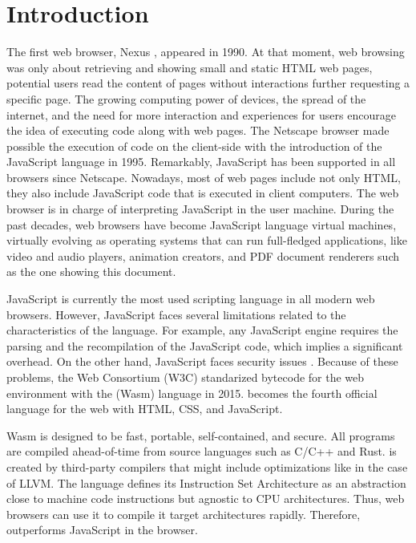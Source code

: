 \chapter{Introduction}
\label{chapter:intro}


The first web browser, Nexus \cite{nexus}, appeared in 1990.
At that moment, web browsing was only about retrieving and showing small and static HTML web pages, \ie potential users read the content of pages without interactions further requesting a specific page.
The growing computing power of devices, the spread of the internet, and the need for more interaction and experiences for users encourage the idea of executing code along with web pages.
The Netscape browser made possible the execution of code on the client-side with the introduction of the JavaScript language in 1995.
Remarkably, JavaScript has been supported in all browsers since Netscape.
Nowadays, most of web pages include not only HTML, they also include JavaScript code that is executed in client computers.
The web browser is in charge of interpreting JavaScript in the user machine.
During the past decades, web browsers have become JavaScript language virtual machines, virtually evolving as operating systems that can run full-fledged applications, like video and audio players, animation creators, and PDF document renderers such as the one showing this document.

JavaScript is currently the most used scripting language in all modern web browsers. 
However, JavaScript faces several limitations related to the characteristics of the language. For example, any JavaScript engine requires the parsing and the recompilation of the JavaScript code, which implies a significant overhead.
On the other hand, JavaScript faces security issues \cite{10.1145/1190216.1190252}.
Because of these problems, the Web Consortium (W3C) standarized bytecode for the web environment with the \wasm (Wasm) language in 2015. 
\wasm becomes the fourth official language for the web with HTML, CSS, and JavaScript.

Wasm is designed to be fast, portable, self-contained, and secure.
All \wasm programs are compiled ahead-of-time from source languages such as C/C++ and Rust.
\wasm is created by third-party compilers that might include optimizations like in the case of LLVM.  
The \wasm language defines its Instruction Set Architecture \cite{wasm_spec} as an abstraction close to machine code instructions but agnostic to CPU architectures. Thus,  web browsers can use it to compile it target architectures rapidly. Therefore, \wasm outperforms JavaScript in the browser.


